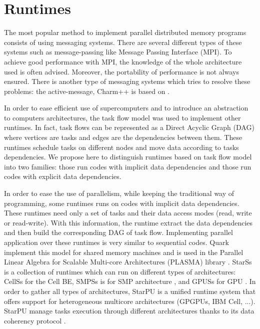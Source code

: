 \section{Runtimes}
The most popular method to implement parallel distributed memory programs consists of using messaging systems. There are several different types of these systems such as message-passing like Message Passing Interface (MPI)\cite{Message94}. To achieve good performance with MPI, the knowledge of the whole architecture used is often advised. Moreover, the portability of performance is not always ensured. There is another type of messaging systems which tries to resolve these problems: the active-message, Charm++ is based on \cite{KaleLVandK1993b}.

In order to ease efficient use of supercomputers and to introduce an abstraction to computers architectures, the task flow model was used to implement other runtimes. In fact, task flows can be represented as a Direct Acyclic Graph (DAG) where vertices are tasks and edges are the dependencies between them. These runtimes schedule tasks on different nodes and move data according to tasks dependencies.
We propose here to distinguish runtimes based on task flow model into two families: those run codes with implicit data dependencies and those run codes with explicit data dependencies.

In order to ease the use of parallelism, while keeping the traditional way of programming, some runtimes runs on codes with implicit data dependencies. These runtimes need only a set of tasks and their data access modes (read, write or read-write). With this information, the runtime extract the data dependencies and then build the corresponding DAG of task flow. Implementing parallel application over these runtimes is very similar to sequential codes. Quark implement this model for shared memory machines and is used in the Parallel Linear Algebra for Scalable Multi-core Architectures (PLASMA) library \cite{1742-6596-180-1-012037}.
StarSs is a collection of runtimes which can run on different types of architectures: CellSs for the Cell BE\cite{Bellens06}, SMPSs is for SMP architecture \cite{journals/concurrency/BadiaHLPQQ09}, and GPUSs for GPU \cite{Ayguade09}. In order to gather all types of architectures, StarPU is a unified runtime system that offers support for heterogeneous multicore architectures (GPGPUs, IBM Cell, ...). StarPU manage tasks execution through different architectures thanks to its data coherency protocol \cite{DoBiBo07,journals/concurrency/AugonnetTNW11}.


